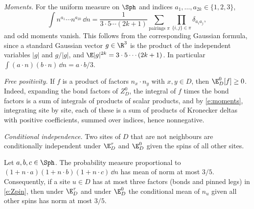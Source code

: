 \emph{Moments.} For the uniform measure on $\Sph$ and indices $a_1, \dots, a_{2k} \in \{1, 2, 3\}$,
\begin{equation}\label{e:moments}
\int n^{a_1} \cdots n^{a_{2k}} \, \dd n = \frac{1}{3 \cdot 5 \cdots (2k + 1)} \sum_{\text{pairings } \pi} \prod_{\{i, j\} \in \pi} \delta_{a_i a_j},
\end{equation}
and odd moments vanish. This follows from the corresponding Gaussian formula, since a standard Gaussian vector $g \in \R^3$ is the product of the independent variables $|g|$ and $g / |g|$, and $\E |g|^{2k} = 3 \cdot 5 \cdots (2k + 1)$. In particular $\int (a \cdot n)(b \cdot n) \, \dd n = a \cdot b / 3$.

\emph{Free positivity.} If $f$ is a product of factors $n_x \cdot n_y$ with $x, y \in D$, then $\E^0_D[f] \ge 0$. Indeed, expanding the bond factors of $Z^0_D$, the integral of $f$ times the bond factors is a sum of integrals of products of scalar products, and by \eqref{e:moments}, integrating site by site, each of these is a sum of products of Kronecker deltas with positive coefficients, summed over indices, hence nonnegative.

\emph{Conditional independence.} Two sites of $D$ that are not neighbours are conditionally independent under $\E^\tau_D$ and $\E^0_D$ given the spins of all other sites.

\begin{lemma}\label{l:35}
Let $a, b, c \in \Sph$. The probability measure proportional to $(1 + n \cdot a)(1 + n \cdot b)(1 + n \cdot c) \, \dd n$ has mean of norm at most $3/5$. Consequently, if a site $u \in D$ has at most three factors (bonds and pinned legs) in \eqref{e:Zpin}, then under $\E^\tau_D$ and under $\E^0_D$ the conditional mean of $n_u$ given all other spins has norm at most $3/5$.
\end{lemma}

